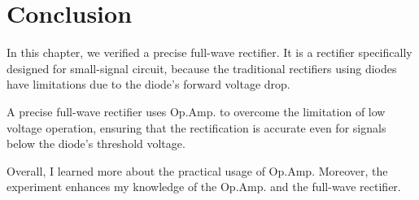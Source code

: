\section{Conclusion}
    In this chapter, we verified a precise full-wave rectifier. It is a rectifier specifically designed for small-signal circuit, because the traditional rectifiers using diodes have limitations due to the diode's forward voltage drop.\par
    A precise full-wave rectifier uses Op.Amp. to overcome the limitation of low voltage operation, ensuring that the rectification is accurate even for signals below the diode's threshold voltage.\par
    Overall, I learned more about the practical usage of Op.Amp. Moreover, the experiment enhances my knowledge of the Op.Amp. and the full-wave rectifier.